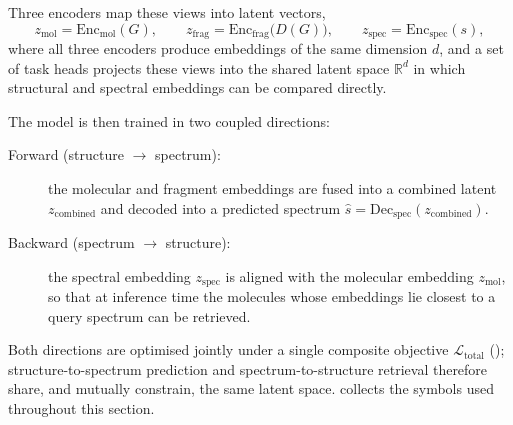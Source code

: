 Three encoders map these views into latent vectors,
\begin{equation}
    \label{eq:encoders}
    z_{\mathrm{mol}} = \mathrm{Enc}_{\mathrm{mol}}(G), \qquad
    z_{\mathrm{frag}} = \mathrm{Enc}_{\mathrm{frag}}\!\bigl(D(G)\bigr), \qquad
    z_{\mathrm{spec}} = \mathrm{Enc}_{\mathrm{spec}}(s),
\end{equation}
where all three encoders produce embeddings of the same dimension $d$, and a set of task heads projects these views into the shared latent space $\mathbb{R}^{d}$ in which structural and spectral embeddings can be compared directly.

The model is then trained in two coupled directions:
\begin{description}
    \item[Forward (structure $\rightarrow$ spectrum):] the molecular and fragment embeddings are fused into a combined latent $z_{\mathrm{combined}}$ and decoded into a predicted spectrum $\hat{s} = \mathrm{Dec}_{\mathrm{spec}}(z_{\mathrm{combined}})$.
    \item[Backward (spectrum $\rightarrow$ structure):] the spectral embedding $z_{\mathrm{spec}}$ is aligned with the molecular embedding $z_{\mathrm{mol}}$, so that at inference time the molecules whose embeddings lie closest to a query spectrum can be retrieved.
\end{description}

Both directions are optimised jointly under a single composite objective $\mathcal{L}_{\mathrm{total}}$ (); structure-to-spectrum prediction and spectrum-to-structure retrieval therefore share, and mutually constrain, the same latent space.
 collects the symbols used throughout this section.

